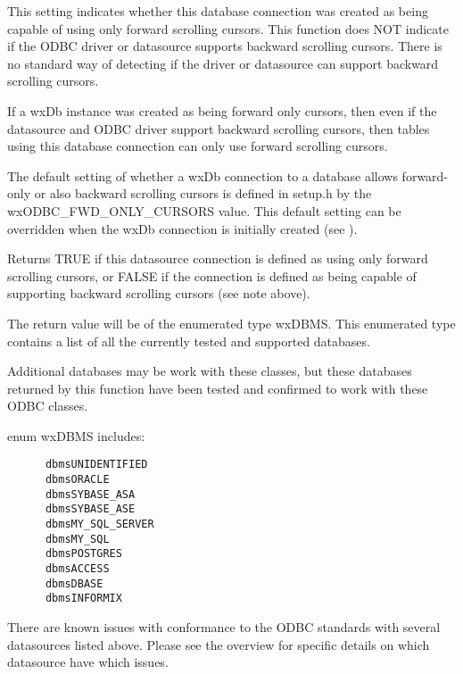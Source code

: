 
This setting indicates whether this database connection was created
as being capable of using only forward scrolling cursors.  This function
does NOT indicate if the ODBC driver or datasource supports backward
scrolling cursors.  There is no standard way of detecting if the driver
or datasource can support backward scrolling cursors.

If a wxDb instance was created as being forward only cursors, then even if
the datasource and ODBC driver support backward scrolling cursors, then
tables using this database connection can only use forward scrolling
cursors.

The default setting of whether a wxDb connection to a database allows
forward-only or also backward scrolling cursors is defined in setup.h by 
the wxODBC_FWD_ONLY_CURSORS value.  This default setting can be overridden
when the wxDb connection is initially created (see ).


Returns TRUE if this datasource connection is defined as using only forward
scrolling cursors, or FALSE if the connection is defined as being capable
of supporting backward scrolling cursors (see note above).



\label{wxdbdbms}



The return value will be of the enumerated type wxDBMS.  This enumerated
type contains a list of all the currently tested and supported databases.

Additional databases may be work with these classes, but these databases
returned by this function have been tested and confirmed to work with 
these ODBC classes.

enum wxDBMS includes:
\begin{verbatim}
      dbmsUNIDENTIFIED
      dbmsORACLE
      dbmsSYBASE_ASA
      dbmsSYBASE_ASE
      dbmsMY_SQL_SERVER
      dbmsMY_SQL
      dbmsPOSTGRES
      dbmsACCESS
      dbmsDBASE
      dbmsINFORMIX	
\end{verbatim}

There are known issues with conformance to the ODBC standards with several
datasources listed above.  Please see the overview for specific details on
which datasource have which issues.

